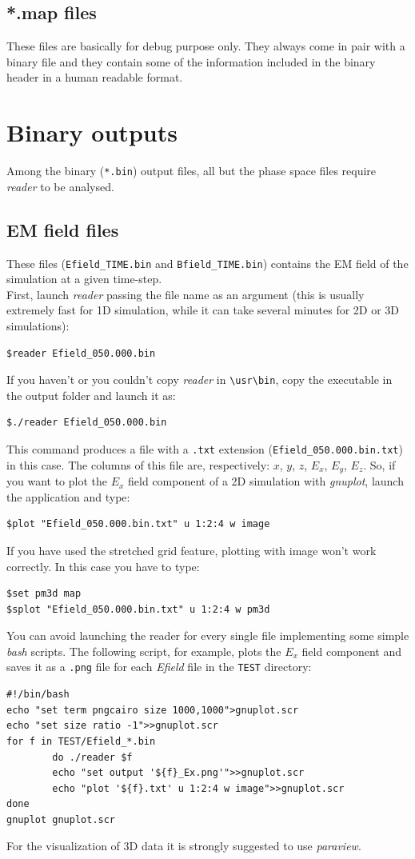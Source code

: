 \documentclass[11pt,a4paper]{report}
\begin{document}
\subsection{*.map files}
These files are basically for debug purpose only. They always come in pair with a binary file and they contain some of the information included in the binary header in a human readable format.

\section{Binary outputs}
Among the binary (\verb+*.bin+) output files, all but the phase space files require \emph{reader} to be analysed. 
\subsection{EM field files}
These files (\verb+Efield_TIME.bin+ and \verb+Bfield_TIME.bin+) contains the EM field of the simulation at a given time-step.\\
First, launch \emph{reader} passing the file name as an argument (this is usually extremely fast for 1D simulation, while it can take several minutes for 2D or 3D simulations):
\begin{verbatim}
$reader Efield_050.000.bin
\end{verbatim}
If you haven't or you couldn't copy \emph{reader} in \verb+\usr\bin+, copy the executable in the output folder and launch it as:
\begin{verbatim}
$./reader Efield_050.000.bin
\end{verbatim}
This command produces a file with a \verb+.txt+ extension (\verb+Efield_050.000.bin.txt+) in this case. The columns of this file are, respectively: $x$, $y$, $z$, $E_x$, $E_y$, $E_z$. So, if you want to plot the $E_x$ field component of a 2D simulation with \emph{gnuplot}, launch the application and type:
\begin{verbatim}
$plot "Efield_050.000.bin.txt" u 1:2:4 w image
\end{verbatim}
If you have used the stretched grid feature, plotting with image won't work correctly. In this case you have to type:
\begin{verbatim}
$set pm3d map
$splot "Efield_050.000.bin.txt" u 1:2:4 w pm3d
\end{verbatim}
You can avoid launching the reader for every single file implementing some simple \emph{bash} scripts. The following script, for example, plots the 
$E_x$ field component and saves it as a \verb+.png+ file for each \emph{Efield} file in the \verb+TEST+ directory:
\begin{verbatim}
#!/bin/bash
echo "set term pngcairo size 1000,1000">gnuplot.scr
echo "set size ratio -1">>gnuplot.scr
for f in TEST/Efield_*.bin
        do ./reader $f
        echo "set output '${f}_Ex.png'">>gnuplot.scr
        echo "plot '${f}.txt' u 1:2:4 w image">>gnuplot.scr 
done
gnuplot gnuplot.scr
\end{verbatim}
For the visualization of 3D data it is strongly suggested to use \emph{paraview}.
\end{document}
